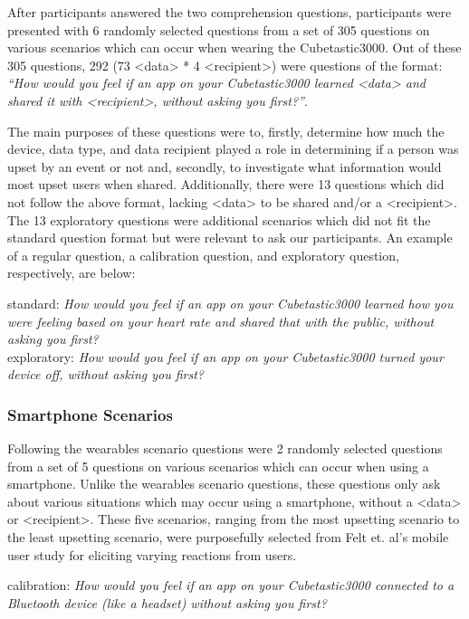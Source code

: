 \documentclass{acm_proc_article-sp}
\begin{document}
After participants answered the two comprehension questions, participants were presented with 6 randomly selected questions from a set of 305 questions on various scenarios which can occur when wearing the Cubetastic3000. Out of these 305 questions, 292 (73 <data> * 4 <recipient>) were questions of the format: \textit{``How would you feel if an app on your Cubetastic3000 learned <data> and shared it with <recipient>, without asking you first?''}. 

The main purposes of these questions were to, firstly, determine how much the device, data type, and data recipient played a role in determining if a person was upset by an event or not and, secondly, to investigate what information would most upset users when shared. Additionally, there were 13 questions which did not follow the above format, lacking <data> to be shared and/or a <recipient>.  The 13 exploratory questions were additional scenarios which did not fit the standard question format but were relevant to ask our participants. An example of a regular question, a calibration question, and exploratory question, respectively, are below:  

standard: \textit{How would you feel if an app on your Cubetastic3000 learned how you were feeling based on your heart rate and shared that with the public, without asking you first?}\\[-.5cm]

exploratory: \textit{How would you feel if an app on your Cubetastic3000 turned your device off, without asking you first?}\\[-.5cm]

\subsubsection{Smartphone Scenarios}
Following the wearables scenario questions were 2 randomly selected questions from a set of 5 questions on various scenarios which can occur when using a smartphone. Unlike the wearables scenario questions, these questions only ask about various situations which may occur using a smartphone, without a <data> or <recipient>. These five scenarios, ranging from the most upsetting scenario to the least upsetting scenario, were purposefully selected from Felt et. al's mobile user study \cite{Felt} for eliciting varying reactions from users. 

calibration: \textit{How would you feel if an app on your Cubetastic3000 connected to a Bluetooth device (like a headset) without asking you first?} \\[-.5cm]
\end{document}

